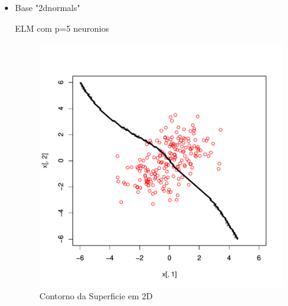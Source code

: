 \documentclass[12pt,a4paper]{article}
\begin{document}
\begin{itemize}

\item Base "2dnormals"
\newline



ELM com p=5 neuronios


\begin{figure}[!htb]
\begin{center}
\includegraphics{exELM-005}
\end{center}
\caption{Contorno da Superficie em 2D}
\label{Contorno da Superficie em 2D}
\end{figure}


\end{itemize}
\end{document}
